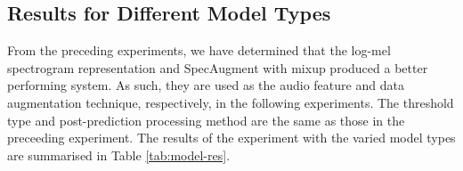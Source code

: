 \subsection{Results for Different Model Types}
From the preceding experiments, we have determined that the log-mel spectrogram representation and SpecAugment with mixup produced a better performing system. As such, they are used as the audio feature and data augmentation technique, respectively, in the following experiments. The threshold type and post-prediction processing method are the same as those in the preceeding experiment. The results of the experiment with the varied model types are summarised in Table \ref{tab:model-res}.

\begin{table}[!htp]
\centering
{}
\end{table}
